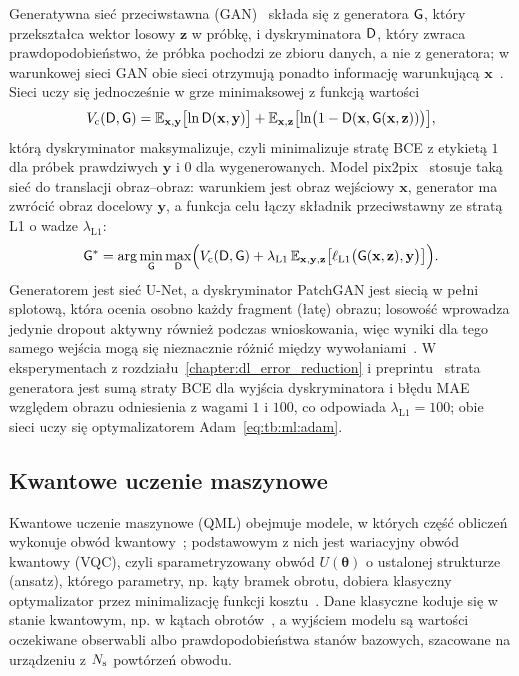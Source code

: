 Generatywna sieć przeciwstawna (GAN)~\cite{goodfellow2014generative} składa się z generatora $\mathsf{G}$, który przekształca wektor losowy $\mathbf{z}$ w próbkę, i dyskryminatora $\mathsf{D}$, który zwraca prawdopodobieństwo, że próbka pochodzi ze zbioru danych, a nie z generatora; w warunkowej sieci GAN obie sieci otrzymują ponadto informację warunkującą $\mathbf{x}$~\cite{mirza2014conditional}.
Sieci uczy się jednocześnie w grze minimaksowej z funkcją wartości
\begin{equation}\label{eq:tb:ml:gan}
V_{\mathrm{c}}(\mathsf{D},\mathsf{G})=\mathbb{E}_{\mathbf{x},\mathbf{y}}\bigl[\ln\mathsf{D}(\mathbf{x},\mathbf{y})\bigr]+\mathbb{E}_{\mathbf{x},\mathbf{z}}\bigl[\ln\bigl(1-\mathsf{D}(\mathbf{x},\mathsf{G}(\mathbf{x},\mathbf{z}))\bigr)\bigr],
\end{equation}
którą dyskryminator maksymalizuje, czyli minimalizuje stratę BCE z etykietą $1$ dla próbek prawdziwych $\mathbf{y}$ i $0$ dla wygenerowanych.
Model pix2pix~\cite{isola_image_2017} stosuje taką sieć do translacji obraz--obraz: warunkiem jest obraz wejściowy $\mathbf{x}$, generator ma zwrócić obraz docelowy $\mathbf{y}$, a funkcja celu łączy składnik przeciwstawny ze stratą L1 o wadze $\lambda_{\mathrm{L1}}$:
\begin{equation}\label{eq:tb:ml:pix2pix}
\mathsf{G}^{*}=\arg\min_{\mathsf{G}}\max_{\mathsf{D}}\Bigl(V_{\mathrm{c}}(\mathsf{D},\mathsf{G})+\lambda_{\mathrm{L1}}\,\mathbb{E}_{\mathbf{x},\mathbf{y},\mathbf{z}}\bigl[\ell_{\mathrm{L1}}\bigl(\mathsf{G}(\mathbf{x},\mathbf{z}),\mathbf{y}\bigr)\bigr]\Bigr).
\end{equation}
Generatorem jest sieć U-Net, a dyskryminator PatchGAN jest siecią w pełni splotową, która ocenia osobno każdy fragment (łatę) obrazu; losowość wprowadza jedynie dropout aktywny również podczas wnioskowania, więc wyniki dla tego samego wejścia mogą się nieznacznie różnić między wywołaniami~\cite{isola_image_2017}.
W eksperymentach z rozdziału~\ref{chapter:dl_error_reduction} i preprintu~\cite{werner_deep_learning_manuscript} strata generatora jest sumą straty BCE dla wyjścia dyskryminatora i błędu MAE względem obrazu odniesienia z wagami $1$ i $100$, co odpowiada $\lambda_{\mathrm{L1}}=100$; obie sieci uczy się optymalizatorem Adam~\eqref{eq:tb:ml:adam}.

\subsection{Kwantowe uczenie maszynowe}\label{subsec:tb:ml:qml}

Kwantowe uczenie maszynowe (QML) obejmuje modele, w których część obliczeń wykonuje obwód kwantowy~\cite{schuld2019qml,benedetti2019vqc}; podstawowym z nich jest wariacyjny obwód kwantowy (VQC), czyli sparametryzowany obwód $U(\boldsymbol{\theta})$ o ustalonej strukturze (ansatz), którego parametry, np. kąty bramek obrotu, dobiera klasyczny optymalizator przez minimalizację funkcji kosztu~\cite{cerezo_variational_2021}.
Dane klasyczne koduje się w stanie kwantowym, np. w kątach obrotów~\cite{benedetti2019vqc}, a wyjściem modelu są wartości oczekiwane obserwabli albo prawdopodobieństwa stanów bazowych, szacowane na urządzeniu z $N_{\mathrm{s}}$ powtórzeń obwodu.

